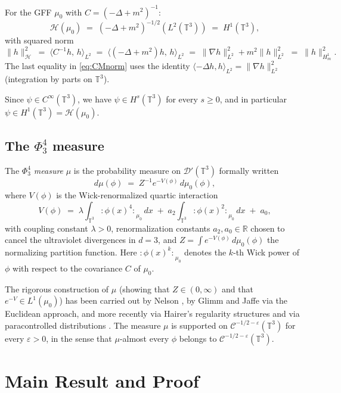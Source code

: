 \documentclass[12pt]{article}
\theoremstyle{definition}
\begin{document}
For the GFF $\mu_0$ with $C=(-\Delta+m^2)^{-1}$:
\[
  \mathcal{H}(\mu_0) \;=\; (-\Delta+m^2)^{-1/2}(L^2(\mathbb{T}^3))
  \;=\; H^1(\mathbb{T}^3),
\]
with squared norm
\begin{equation}
  \|h\|_{\mathcal{H}}^2
  \;=\; \langle C^{-1}h,\, h\rangle_{L^2}
  \;=\; \langle (-\Delta+m^2)h,\, h\rangle_{L^2}
  \;=\; \|\nabla h\|_{L^2}^2 + m^2\|h\|_{L^2}^2
  \;=\; \|h\|_{H^1_m}^2.
  \label{eq:CMnorm}
\end{equation}
The last equality in \eqref{eq:CMnorm} uses the identity
$\langle -\Delta h, h\rangle_{L^2} = \|\nabla h\|_{L^2}^2$ (integration by parts on $\mathbb{T}^3$).

Since $\psi\in C^\infty(\mathbb{T}^3)$, we have $\psi\in H^s(\mathbb{T}^3)$ for every $s\geq 0$, and in
particular $\psi\in H^1(\mathbb{T}^3) = \mathcal{H}(\mu_0)$.

\subsection{The $\Phi^4_3$ measure}

The \emph{$\Phi^4_3$ measure} $\mu$ is the probability measure on $\mathcal{D}'(\mathbb{T}^3)$
formally written
\[
  d\mu(\phi) \;=\; Z^{-1} e^{-V(\phi)}\, d\mu_0(\phi),
\]
where $V(\phi)$ is the Wick-renormalized quartic interaction
\[
  V(\phi) \;=\; \lambda \int_{\mathbb{T}^3} {:\phi(x)^4:}_{\mu_0}\, dx
  \;+\; a_2 \int_{\mathbb{T}^3} {:\phi(x)^2:}_{\mu_0}\, dx
  \;+\; a_0,
  \label{eq:interaction}
\]
with coupling constant $\lambda>0$, renormalization constants $a_2, a_0\in\mathbb{R}$ chosen to
cancel the ultraviolet divergences in $d=3$, and $Z = \int e^{-V(\phi)}\,d\mu_0(\phi)$
the normalizing partition function.  Here ${:\phi(x)^k:}_{\mu_0}$ denotes the $k$-th Wick power
of $\phi$ with respect to the covariance $C$ of $\mu_0$.

The rigorous construction of $\mu$ (showing that $Z\in(0,\infty)$ and that $e^{-V}\in L^1(\mu_0)$)
has been carried out by Nelson \cite{Nelson1966}, by Glimm and Jaffe
\cite{GlimmJaffe1987} via the Euclidean approach, and more recently via Hairer's regularity
structures \cite{Hairer2014} and via paracontrolled distributions
\cite{GubinelliHofmanova2019}.  The measure $\mu$ is supported on $\mathcal{C}^{-1/2-\varepsilon}(\mathbb{T}^3)$
for every $\varepsilon>0$, in the sense that $\mu$-almost every $\phi$ belongs to
$\mathcal{C}^{-1/2-\varepsilon}(\mathbb{T}^3)$.

\section{Main Result and Proof}
\end{document}

